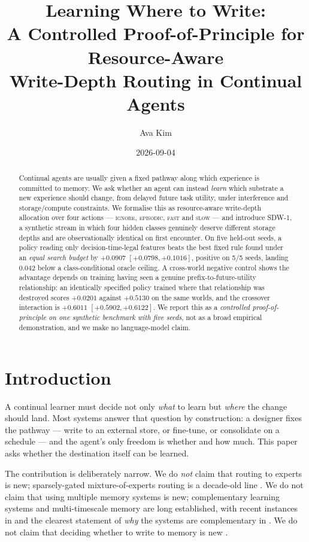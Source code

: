 \documentclass[11pt]{article}
\title{Learning Where to Write:\\
A Controlled Proof-of-Principle for Resource-Aware\\
Write-Depth Routing in Continual Agents}
\author{Ava Kim}
\date{2026-09-04}
\begin{document}
\maketitle

\begin{abstract}
Continual agents are usually given a fixed pathway along which experience is
committed to memory. We ask whether an agent can instead \emph{learn} which
substrate a new experience should change, from delayed future task utility,
under interference and storage/compute constraints. We formalise this as
resource-aware write-depth allocation over four actions --- \textsc{ignore},
\textsc{episodic}, \textsc{fast} and \textsc{slow} --- and introduce SDW-1, a
synthetic stream in which four hidden classes genuinely deserve different
storage depths and are observationally identical on first encounter. On five
held-out seeds, a policy reading only decision-time-legal features beats the
best fixed rule found under an \emph{equal search budget} by
$+0.0907$ $[+0.0798, +0.1016]$, positive on 5/5 seeds, landing $0.042$ below a
class-conditional oracle ceiling. A cross-world negative control shows the
advantage depends on training having seen a genuine prefix-to-future-utility
relationship: an identically specified policy trained where that relationship
was destroyed scores $+0.0201$ against $+0.5130$ on the same worlds, and the
crossover interaction is $+0.6011$ $[+0.5902, +0.6122]$. We report this as a
\emph{controlled proof-of-principle on one synthetic benchmark with five seeds},
not as a broad empirical demonstration, and we make no language-model claim.
\end{abstract}

\section{Introduction}

A continual learner must decide not only \emph{what} to learn but \emph{where}
the change should land. Most systems answer that question by construction: a
designer fixes the pathway --- write to an external store, or fine-tune, or
consolidate on a schedule --- and the agent's only freedom is whether and how
much. This paper asks whether the destination itself can be learned.

The contribution is deliberately narrow. We do \emph{not} claim that routing to
experts is new; sparsely-gated mixture-of-experts routing is a decade-old line
\cite{shazeer2017moe,fedus2021switch,zhou2025twolevel,guo2026stablerouting}. We
do not claim that using multiple memory systems is new; complementary learning
systems and multi-timescale memory are long established, with recent instances
in \cite{behrouz2024titans,pattichis2026multitimescale,tiwari2026fastslow} and
the clearest statement of \emph{why} the systems are complementary in
\cite{lampinen2025latent}. We do not claim that deciding whether to write to
memory is new \cite{yan2025memoryr1,simsek2026forget,hu2026memrouter,jaber2026memoir}.
\end{document}
